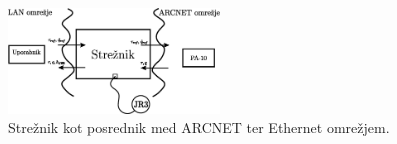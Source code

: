 \begin{figure}
	\centering
	\includegraphics[width=0.5\textwidth]{./Slike/udp-arcnet-server.eps}
	\caption{Stre\v{z}nik kot posrednik med ARCNET ter Ethernet omre\v{z}jem.}
	\label{fig:udp-arcnet-server}
\end{figure}
